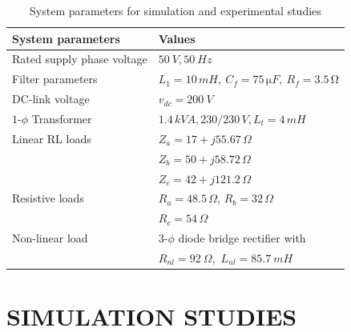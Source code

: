 \begin{table}[t!] 
	\centering
	\caption{System parameters for simulation and experimental studies}
	\label{Table5.4}
	\begin{tabular}{>{\small}l>{\small}l}  
		\hline
		\hline
		\textbf{\footnotesize System parameters} & \textbf{\footnotesize Values}\\
		\hline
		\footnotesize Rated supply phase voltage & \footnotesize$50 ~\si{V}, 50 ~\si{Hz}$ \\
		\footnotesize Filter parameters & \footnotesize $L_{1} = 10 \,\si{mH}, ~ C_f = 75\,\si{\micro F}, ~ R_f = 3.5\,\si{\ohm}$ \\ 
		\footnotesize DC-link voltage & \footnotesize $v_{dc} = 200 ~\si{V}$ \\
		\footnotesize $1$-$\phi$ Transformer & \footnotesize $1.4 \, \si{kVA}, 230/230\,\si{V}, L_{t} = 4\,\si{mH}$ \\
		\footnotesize Linear RL loads  &  \footnotesize $Z_{a} = 17+j55.67\,\si{\Omega}$ \\ & \footnotesize $Z_{b} = 50+j58.72\, \si{\Omega}$ \\  & \footnotesize $Z_{c} = 42+j121.2\, \si{\Omega}$ \\
		\footnotesize Resistive loads  &  \footnotesize $R_{a} = 48.5\,\si{\Omega}$, \footnotesize $R_{b} = 32\, \si{\Omega}$ \\  & \footnotesize $R_{c} = 54\, \si{\Omega}$ \\
		\footnotesize Non-linear load  &  \footnotesize $3$-$\phi$ diode bridge rectifier with \\ & \footnotesize $R_{nl} = 92  ~\Omega$,\, $L_{nl} = 85.7 ~\si{mH}$ \\ 
		\hline
		\hline 
	\end{tabular} %
\end{table}

\section{SIMULATION STUDIES}

